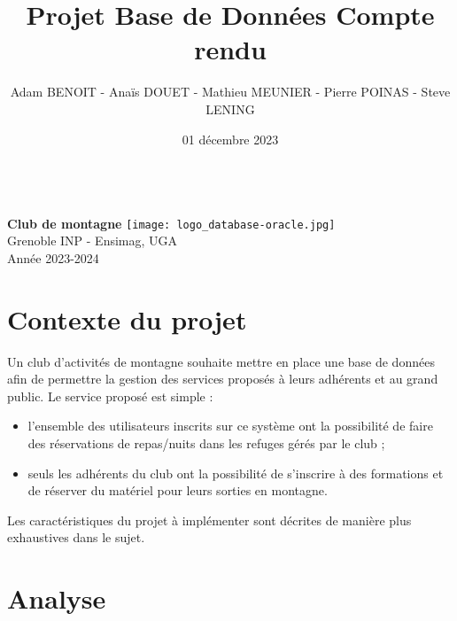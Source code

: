 \documentclass[a4paper, 10pt]{article} %
\title{Projet Base de Données Compte rendu}
\author{Adam BENOIT - Anaïs DOUET - Mathieu MEUNIER - Pierre POINAS - Steve LENING}
\date{01 décembre 2023}
\makeatletter
\let\Titre\@title
\let\Auteurs\@author
\makeatother
\begin{document}
\begin{titlepage}
\begin{center}
  \color{Navy}
  \fontsize{35pt}{12.8pt}
  \textbf{\Titre}\\
  \vspace{20pt}
  \color{Black}
  \Huge
  \textbf{Club de montagne}
  \vfill
  \texttt{[image: logo\_database-oracle.jpg]} 
  \vfill
  \normalsize
  \textbf{\Auteurs}\\
  Grenoble INP - Ensimag, UGA \\
  Année 2023-2024
\end{center}
\end{titlepage}



\section*{Contexte du projet}
Un club d'activités de montagne souhaite mettre en place une base de données afin de permettre la gestion des services proposés à leurs adhérents et au grand public. Le service proposé est simple :
\begin{itemize}[label=$\bullet$]
    \item l'ensemble des utilisateurs inscrits sur ce système ont la possibilité de faire des réservations de repas/nuits dans les refuges gérés par le club ;
    \item seuls les adhérents du club ont la possibilité de s'inscrire à des formations et de réserver du matériel pour leurs sorties en montagne. 
\end{itemize}
Les caractéristiques du projet à implémenter sont décrites de manière plus exhaustives dans le sujet.



\vspace{2em}

\tableofcontents

\newpage





\section{Analyse}
\end{document}
